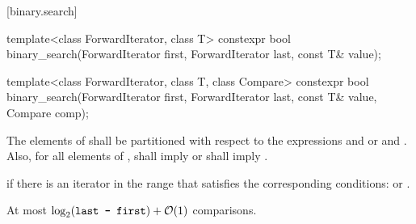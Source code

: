 [binary.search]{}

%
\begin{itemdecl}
template<class ForwardIterator, class T>
  constexpr bool
    binary_search(ForwardIterator first, ForwardIterator last,
                  const T& value);

template<class ForwardIterator, class T, class Compare>
  constexpr bool
    binary_search(ForwardIterator first, ForwardIterator last,
                  const T& value, Compare comp);
\end{itemdecl}

\begin{itemdescr}
\pnum
\requires
The elements
of
shall be partitioned with respect to the expressions
and
or
and
.
Also, for all elements
of
\tcode{[first, last)},
shall imply
or
shall imply
.

\pnum
\returns
{}
if there is an iterator
in the range
that satisfies the corresponding conditions:
or
.

\pnum
\complexity
At most
$\log_2(\texttt{last - first}) + \mathcal{O}(1)$
comparisons.
\end{itemdescr}

